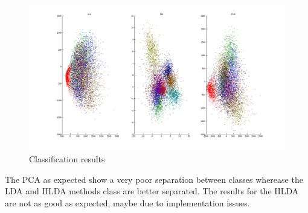 \begin{center}
\begin{figure}[H!]
  \includegraphics[scale=0.30]{img/classif}
  \caption{Classification results}
  \label{img:iter}
\end{figure}
\end{center}

The PCA as expected show a very poor separation between classes wherease the LDA and HLDA
methods class are better separated. The results for the HLDA are not as good as expected,
maybe due to implementation issues.
